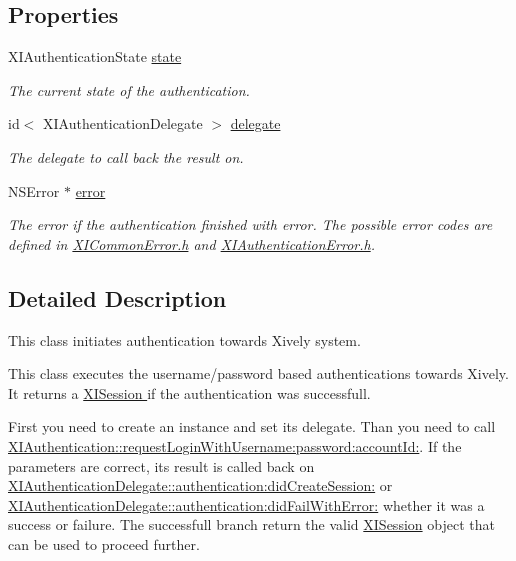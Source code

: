 \subsection*{Properties}
\begin{DoxyCompactItemize}
\item 
X\+I\+Authentication\+State \hyperlink{class_x_i_authentication_a59528547df840ad2a9708b9a30af4540}{state}
\begin{DoxyCompactList}\small\item\em The current state of the authentication. \end{DoxyCompactList}\item 
id$<$ X\+I\+Authentication\+Delegate $>$ \hyperlink{class_x_i_authentication_a7daae4919be8aa935e600b1ee959f70c}{delegate}
\begin{DoxyCompactList}\small\item\em The delegate to call back the result on. \end{DoxyCompactList}\item 
N\+S\+Error $\ast$ \hyperlink{class_x_i_authentication_a57d9e97d981ae0ba9c9bacf431989596}{error}
\begin{DoxyCompactList}\small\item\em The error if the authentication finished with error. The possible error codes are defined in \hyperlink{_x_i_common_error_8h}{X\+I\+Common\+Error.\+h} and \hyperlink{_x_i_authentication_error_8h}{X\+I\+Authentication\+Error.\+h}. \end{DoxyCompactList}\end{DoxyCompactItemize}


\subsection{Detailed Description}
This class initiates authentication towards Xively system. 

This class executes the username/password based authentications towards Xively. It returns a \hyperlink{}{X\+I\+Session } if the authentication was successfull. 

First you need to create an instance and set its delegate. Than you need to call \hyperlink{class_x_i_authentication_a214a506a3c3b080ffa2684ea7b23fc41}{X\+I\+Authentication\+::request\+Login\+With\+Username\+:password\+:account\+Id\+:}. If the parameters are correct, its result is called back on \hyperlink{}{X\+I\+Authentication\+Delegate\+::authentication\+:did\+Create\+Session\+:} or \hyperlink{}{X\+I\+Authentication\+Delegate\+::authentication\+:did\+Fail\+With\+Error\+:} whether it was a success or failure. The successfull branch return the valid \hyperlink{}{X\+I\+Session} object that can be used to proceed further. 

